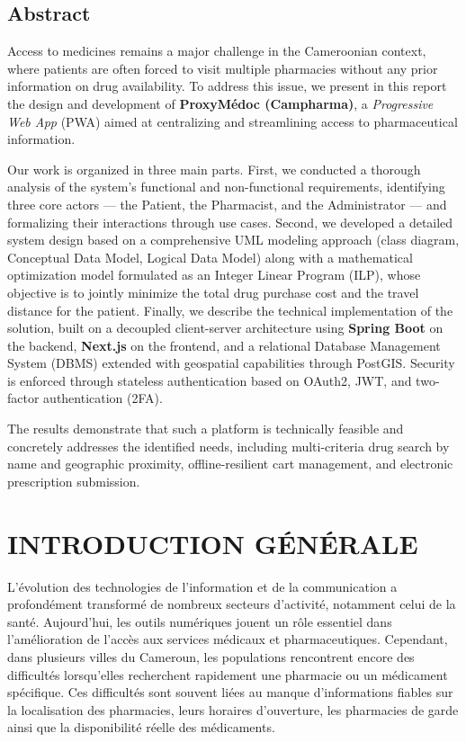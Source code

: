 \documentclass[12pt,a4paper]{report}
\begin{document}
	\bigskip
	\bigskip
    \newpage
    
	\section*{Abstract}
	Access to medicines remains a major challenge in the Cameroonian context, where patients are often forced to visit multiple pharmacies without any prior information on drug availability. To address this issue, we present in this report the design and development of \textbf{ProxyMédoc (Campharma)}, a \textit{Progressive Web App} (PWA) aimed at centralizing and streamlining access to pharmaceutical information.

	Our work is organized in three main parts. First, we conducted a thorough analysis of the system's functional and non-functional requirements, identifying three core actors --- the Patient, the Pharmacist, and the Administrator --- and formalizing their interactions through use cases. Second, we developed a detailed system design based on a comprehensive UML modeling approach (class diagram, Conceptual Data Model, Logical Data Model) along with a mathematical optimization model formulated as an Integer Linear Program (ILP), whose objective is to jointly minimize the total drug purchase cost and the travel distance for the patient. Finally, we describe the technical implementation of the solution, built on a decoupled client-server architecture using \textbf{Spring Boot} on the backend, \textbf{Next.js} on the frontend, and a relational Database Management System (DBMS) extended with geospatial capabilities through PostGIS. Security is enforced through stateless authentication based on OAuth2, JWT, and two-factor authentication (2FA).

	The results demonstrate that such a platform is technically feasible and concretely addresses the identified needs, including multi-criteria drug search by name and geographic proximity, offline-resilient cart management, and electronic prescription submission.

	\vspace{0.5cm}
	
	
	\chapter*{INTRODUCTION GÉNÉRALE} 
	L'évolution des technologies de l'information et de la communication a profondément transformé de nombreux secteurs d'activité, notamment celui de la santé. Aujourd'hui, les outils numériques jouent un rôle essentiel dans l'amélioration de l'accès aux services médicaux et pharmaceutiques. Cependant, dans plusieurs villes du Cameroun, les populations rencontrent encore des difficultés lorsqu'elles recherchent rapidement une pharmacie ou un médicament spécifique. Ces difficultés sont souvent liées au manque d'informations fiables sur la localisation des pharmacies, leurs horaires d'ouverture, les pharmacies de garde ainsi que la disponibilité réelle des médicaments.
\end{document}

